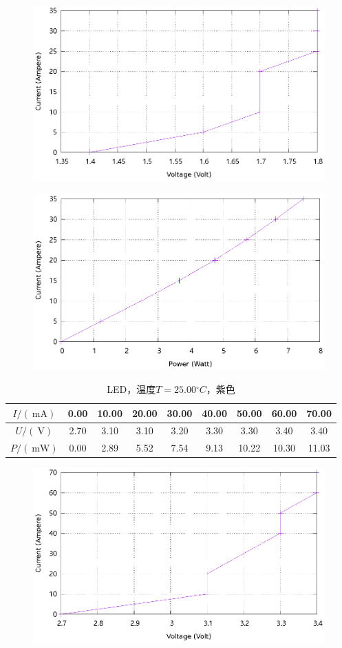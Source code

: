 \documentclass{ctexart}
\newcommand{\si}[1]{\  \mathrm{#1}}
\begin{document}
\begin{figure}[H]
    \centering
    \includegraphics[width=0.9\linewidth]{../output/led-vc-1.gnuplot}
\end{figure}
\begin{figure}[H]
    \centering
    \includegraphics[width=0.9\linewidth]{../output/led-pc-1.gnuplot}
\end{figure}
\newpage
\begin{table}[H]
    \centering
    \begin{tabular}{|c|c|c|c|c|c|c|c|c|}
        \hline
        $I/(\si{mA})$ & 0.00 & 10.00 & 20.00 & 30.00 & 40.00 & 50.00 & 60.00 & 70.00 \\\hline
        $U / (\si{V})$  & 2.70 & 3.10 & 3.10 & 3.20 & 3.30 & 3.30 & 3.40 & 3.40 \\\hline
        $P / (\si{mW})$ & 0.00 & 2.89 & 5.52 & 7.54 & 9.13 & 10.22 & 10.30 & 11.03 \\\hline
    \end{tabular}
    \caption{LED，温度$T=25.00{}^{\circ}C$，紫色}
\end{table}
\begin{figure}[H]
    \centering
    \includegraphics[width=0.9\linewidth]{../output/led-vc-2.gnuplot}
\end{figure}
\end{document}
